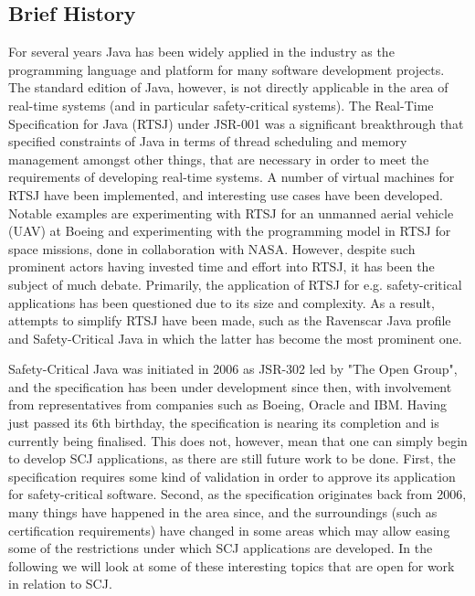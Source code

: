 \subsection{Brief History} %
\label{sub:brief_history_of_java_for_safety_critical_systems}
For several years Java has been widely applied in the industry as the programming language and platform for many software development projects. The standard edition of Java, however, is not directly applicable in the area of real-time systems (and in particular safety-critical systems). The Real-Time Specification for Java (RTSJ) under JSR-001\cite{alan2001real}\cite{henties:2009-20} was a significant breakthrough that specified constraints of Java in terms of thread scheduling and memory management amongst other things, that are necessary in order to meet the requirements of developing real-time systems. A number of virtual machines for RTSJ have been implemented, and interesting use cases have been developed. Notable examples are experimenting with RTSJ for an unmanned aerial vehicle (UAV) at Boeing\cite{Armbruster:2007:RJV:1324969.1324974} and experimenting with the programming model in RTSJ for space missions, done in collaboration with NASA\cite{DBLP:conf/isorc/DvorakBCCCGIMMR04}. However, despite such prominent actors having invested time and effort into RTSJ, it has been the subject of much debate. Primarily, the application of RTSJ for e.g. safety-critical applications has been questioned due to its size and complexity. As a result, attempts to simplify RTSJ have been made, such as the Ravenscar Java profile and Safety-Critical Java in which the latter has become the most prominent one.

Safety-Critical Java was initiated in 2006 as JSR-302 led by "The Open Group", and the specification has been under development since then, with involvement from representatives from companies such as Boeing, Oracle and IBM. Having just passed its 6th birthday, the specification is nearing its completion and is currently being finalised. This does not, however, mean that one can simply begin to develop SCJ applications, as there are still future work to be done. First, the specification requires some kind of validation in order to approve its application for safety-critical software. Second, as the specification originates back from 2006, many things have happened in the area since, and the surroundings (such as certification requirements) have changed in some areas which may allow easing some of the restrictions under which SCJ applications are developed. In the following we will look at some of these interesting topics that are open for work in relation to SCJ.

